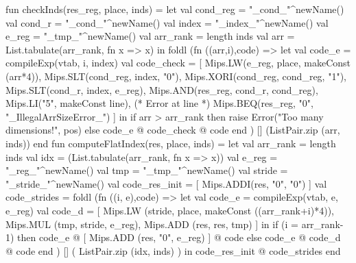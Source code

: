 \documentclass[10pt]{article}
\begin{document}
\begin{fancycode}[frame=lines,fontsize=\scriptsize,label=\textit{edited code - SRC/Compiler.sml}]
            fun checkInds(res_reg, place, inds) =
                let
                    val cond_reg = "_cond_"^newName()
                    val cond_r   = "_cond_"^newName()
                    val index    = "_index_"^newName()
                    val e_reg    = "_tmp_"^newName()
                    val arr_rank = length inds
                    val arr = List.tabulate(arr_rank, fn x => x)
                in
                    foldl (fn ((arr,i),code) =>
                        let
                            val code_e     = compileExp(vtab, i, index)
                            val code_check = [
                              Mips.LW(e_reg, place, makeConst (arr*4)),
                              Mips.SLT(cond_reg, index, "0"),
                              Mips.XORI(cond_reg, cond_reg, "1"),
                              Mips.SLT(cond_r, index, e_reg),
                              Mips.AND(res_reg, cond_r, cond_reg),
                              Mips.LI("5", makeConst line), (* Error at line *)
                              Mips.BEQ(res_reg, "0", "_IllegalArrSizeError_")
                            ]
                        in
                          if arr > arr_rank then raise Error("Too many dimensions!", pos) else
                          code_e @ code_check @ code
                        end
                    ) [] (ListPair.zip (arr, inds))
                end
                fun computeFlatIndex(res, place, inds) =
                let
                    val arr_rank = length inds
                    val idx  = (List.tabulate(arr_rank, fn x => x))
                    val e_reg    = "_reg_"^newName()
                    val tmp    = "_tmp_"^newName()
                    val stride = "_stride_"^newName()
                    val code_res_init = [ Mips.ADDI(res, "0", "0") ]
                    val code_strides = foldl (fn ((i, e),code) =>
                        let val code_e = compileExp(vtab, e, e_reg)
                            val code_d = [ Mips.LW  (stride, place,   makeConst ((arr_rank+i)*4)),
                                           Mips.MUL (tmp, stride, e_reg),
                                           Mips.ADD (res, res, tmp) ]
                        in
                            if (i = arr_rank-1) then
                                code_e @ [ Mips.ADD (res, "0", e_reg) ] @ code
                            else
                                code_e @ code_d @ code
                        end
                    ) [] ( ListPair.zip (idx, inds) )
                in
                    code_res_init @ code_strides
                end

\end{fancycode}
\end{document}
